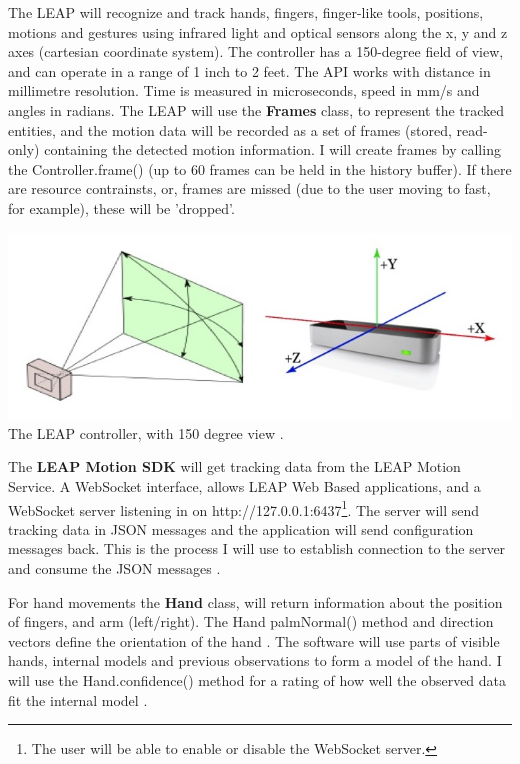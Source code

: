 \documentclass[a4paper, 10pt]{article}
\begin{document}
The LEAP will recognize and track hands, fingers, finger-like tools, positions, motions and gestures using infrared light and optical sensors along the x, y and z axes (cartesian coordinate system). The controller has a 150-degree field of view, and can operate in a range of 1 inch to 2 feet. The API works with distance in millimetre resolution. Time is measured in microseconds, speed in mm/s and angles in radians. The LEAP will use the \textbf{Frames} class, to represent the tracked entities, and the motion data will be recorded as a set of frames (stored, read-only) containing the detected motion information. I will create frames by calling the Controller.frame() (up to 60 frames can be held in the history buffer). If there are resource contrainsts, or, frames are missed (due to the user moving to fast, for example), these will be 'dropped'.

\begin{center}
\includegraphics[scale=0.4]{leap}\\
The LEAP controller, with 150 degree view \cite{leap}.
\end{center}

The \textbf{LEAP Motion SDK} will get tracking data from the LEAP Motion Service. A WebSocket interface, allows LEAP Web Based applications, and a WebSocket server listening in on http://127.0.0.1:6437\footnote{The user will be able to enable or disable the WebSocket server.}. The server will send tracking data in JSON messages and the application will send configuration messages back. This is the process I will use to establish connection to the server and consume the JSON messages \cite{leap}. 

For hand movements the \textbf{Hand} class, will return information about the position of fingers, and arm (left/right). The Hand palmNormal() method and direction vectors define the orientation of the hand \cite{leap}. The software will use parts of visible hands, internal models and previous observations to form a model of the hand. I will use the Hand.confidence() method for a rating of how well the observed data fit the internal model \cite{leap}.
\end{document}
